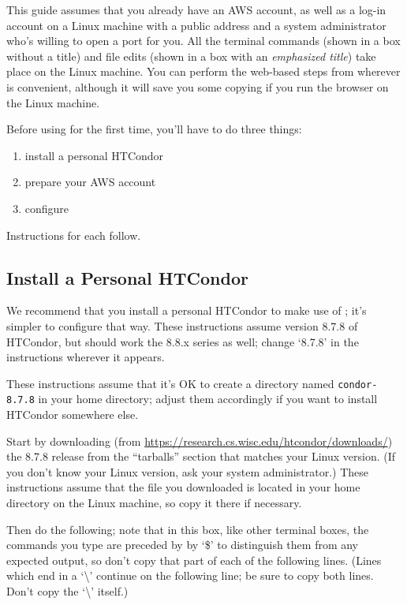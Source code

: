 This guide assumes that you already have an AWS account, as well as a log-in
account on a Linux machine with a public address and a system administrator
who's willing to open a port for you.  All the terminal commands (shown in a
box without a title) and file edits (shown in a box with an
\emph{emphasized title}) take place on the Linux machine.  You can perform the
web-based steps from wherever is convenient, although it will save you some
copying if you run the browser on the Linux machine.

Before using  for the first time, you'll have to do three things:

\begin{enumerate}
\item install a personal HTCondor
\item prepare your AWS account
\item configure 
\end{enumerate}

Instructions for each follow.

\subsection{Install a Personal HTCondor}

We recommend that you install a personal HTCondor to make use of ;
it's simpler to configure that way.  These instructions assume version 8.7.8
of HTCondor, but should work the 8.8.x series as well; change `8.7.8' in
the instructions wherever it appears.

These instructions assume that it's OK to create a directory named
\texttt{condor-8.7.8} in your home directory; adjust them accordingly if you
want to install HTCondor somewhere else.

Start by downloading (from
\url{https://research.cs.wisc.edu/htcondor/downloads/}) the 8.7.8 release from
the ``tarballs'' section that matches your Linux version.  (If you don't know
your Linux version, ask your system administrator.)  These instructions assume
that the file you downloaded is located in your home directory on the Linux
machine, so copy it there if necessary.

Then do the following; note that in this box, like other terminal boxes,
the commands you type are preceded by by `\$' to distinguish them from any
expected output, so don't copy that part of each of the following lines.
(Lines which end in a `\textbackslash' continue on the following line; be
sure to copy both lines.  Don't copy the `\textbackslash' itself.)

